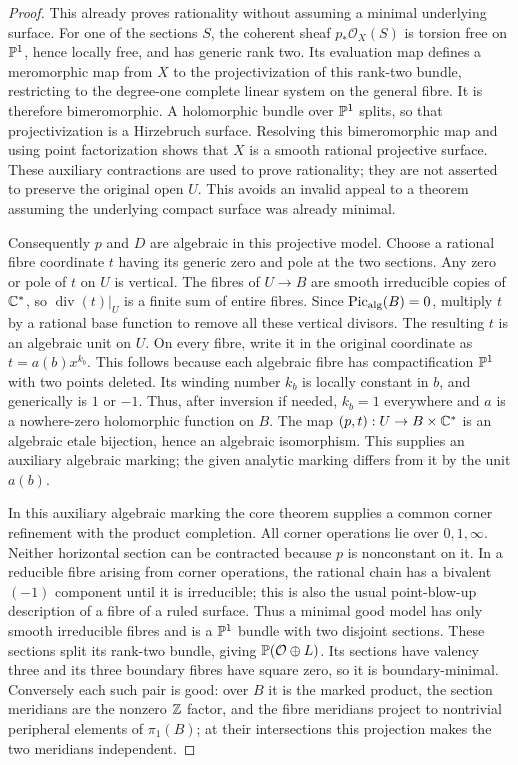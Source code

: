 \begin{proof}
This already proves rationality without assuming a minimal
underlying surface. For one of the sections $S$, the coherent
sheaf $p_*\mathcal O_X(S)$ is torsion free on $\mathbb P^1$, hence
locally free, and has generic rank two. Its evaluation map
defines a meromorphic map from $X$ to the projectivization of
this rank-two bundle, restricting to the degree-one complete
linear system on the general fibre. It is therefore bimeromorphic.
A holomorphic bundle over $\mathbb P^1$ splits, so that projectivization
is a Hirzebruch surface. Resolving this bimeromorphic map and
using point factorization shows that $X$ is a smooth rational
projective surface. These auxiliary contractions are used to
prove rationality; they are not asserted to preserve the
original open $U$. This avoids an invalid appeal to a theorem
assuming the underlying compact surface was already minimal.

Consequently $p$ and $D$ are algebraic in this projective model.
Choose a rational fibre coordinate $t$ having its generic zero
and pole at the two sections. Any zero or pole of $t$ on
$U$ is vertical. The fibres of $U\to B$ are smooth irreducible
copies of $\mathbb C^*$, so
$\operatorname{div}(t)|_U$ is a finite sum of entire fibres.
Since $\operatorname{Pic}_{\rm alg}(B)=0$, multiply $t$ by a
rational base function to remove all these vertical divisors.
The resulting $t$ is an algebraic unit on $U$. On every fibre,
write it in the original coordinate as
$t=a(b)x^{k_b}$. This follows because each algebraic fibre has
compactification $\mathbb P^1$ with two points deleted. Its winding
number $k_b$ is locally constant in $b$, and generically is
$1$ or $-1$. Thus, after inversion if needed, $k_b=1$
everywhere and $a$ is a nowhere-zero holomorphic function on
$B$. The map $(p,t):U\to B\times\mathbb C^*$ is an algebraic etale
bijection, hence an algebraic isomorphism. This supplies an
auxiliary algebraic marking; the given analytic marking
differs from it by the unit $a(b)$.

In this auxiliary algebraic marking the core theorem supplies
a common corner refinement with the product completion.
All corner operations lie over $0,1,\infty$. Neither horizontal
section can be contracted because $p$ is nonconstant on it.
In a reducible fibre arising from corner operations, the
rational chain has a bivalent $(-1)$ component until it is
irreducible; this is also the usual point-blow-up description
of a fibre of a ruled surface. Thus a minimal good model has
only smooth irreducible fibres and is a $\mathbb P^1$ bundle with
two disjoint sections. These sections split its rank-two
bundle, giving $\mathbb P(\mathcal O\oplus L)$. Its sections have
valency three and its three boundary fibres have square zero,
so it is boundary-minimal. Conversely each such pair is good:
over $B$ it is the marked product, the section meridians are
the nonzero $\mathbb Z$ factor, and the fibre meridians project to
nontrivial peripheral elements of $\pi _1(B)$; at their
intersections this projection makes the two meridians independent.


\end{proof}
